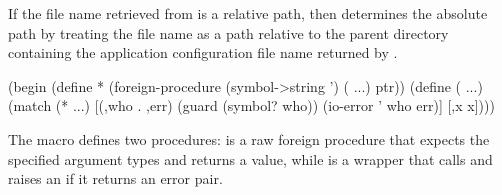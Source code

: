 If the file name retrieved from  is a relative path,
then  determines the absolute path by
treating the file name as a path relative to the parent directory
containing the application configuration file name returned by .

\begin{syntax}
\end{syntax}
\expandsto{} \antipar\codebegin
(begin
  (define * (foreign-procedure (symbol->string ') ( ...) ptr))
  (define (  ...)
    (match (*  ...)
      [(,who . ,err)
       (guard (symbol? who))
       (io-error ' who err)]
      [,x x])))
\codeend

The  macro defines two procedures: 
is a raw foreign procedure that expects the specified argument types and returns
a  value, while  is a wrapper that calls 
and raises an  if it returns an error pair.


